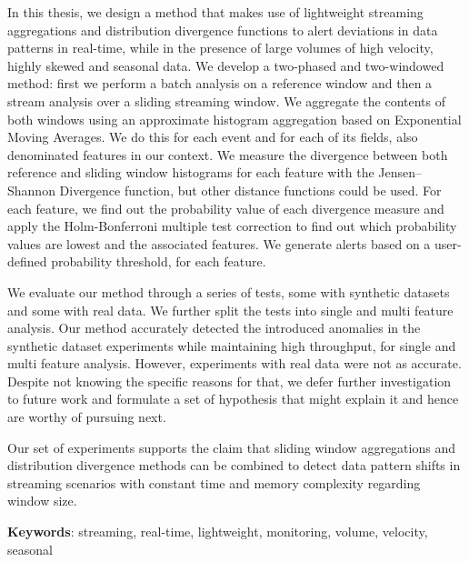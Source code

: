 In this thesis, we design a method that makes use of lightweight streaming aggregations and distribution divergence functions to alert deviations in data patterns in real-time, while in the presence of large volumes of high velocity, highly skewed and seasonal data. We develop a two-phased and two-windowed method: first we perform a batch analysis on a reference window and then a stream analysis over a sliding streaming window. We aggregate the contents of both windows using an approximate histogram aggregation based on Exponential Moving Averages. We do this for each event and for each of its fields, also denominated features in our context. We measure the divergence between both reference and sliding window histograms for each feature with the Jensen–Shannon Divergence function, but other distance functions could be used. For each feature, we find out the probability value of each divergence measure and apply the Holm-Bonferroni multiple test correction to find out which probability values are lowest and the associated features. We generate alerts based on a user-defined probability threshold, for each feature.

We evaluate our method through a series of tests, some with synthetic datasets and some with real data. We further split the tests into single and multi feature analysis. Our method accurately detected the introduced anomalies in the synthetic dataset experiments while maintaining high throughput, for single and multi feature analysis. However, experiments with real data were not as accurate. Despite not knowing the specific reasons for that, we defer further investigation to future work and formulate a set of hypothesis that might explain it and hence are worthy of pursuing next.

Our set of experiments supports the claim that sliding window aggregations and distribution divergence methods can be combined to detect data pattern shifts in streaming scenarios with constant time and memory complexity regarding window size.

\vspace*{10mm}\noindent
\textbf{Keywords}: streaming, real-time, lightweight, monitoring, volume, velocity, seasonal

